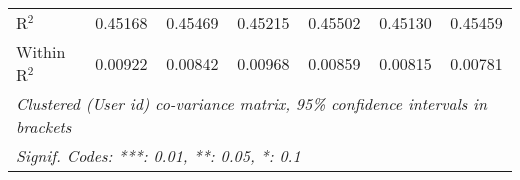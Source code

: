 \begin{table}[htbp]
\begin{threeparttable}[b]
\begin{tabular}{lcccccc}
         R$^2$                            & 0.45168          & 0.45469          & 0.45215          & 0.45502          & 0.45130          & 0.45459\\  
         Within R$^2$                     & 0.00922          & 0.00842          & 0.00968          & 0.00859          & 0.00815          & 0.00781\\  
         \midrule \midrule
         \multicolumn{7}{l}{\emph{Clustered (User id) co-variance matrix, 95\% confidence intervals in brackets}}\\
         \multicolumn{7}{l}{\emph{Signif. Codes: ***: 0.01, **: 0.05, *: 0.1}}\\
      \end{tabular}
   \end{threeparttable}
\end{table}


